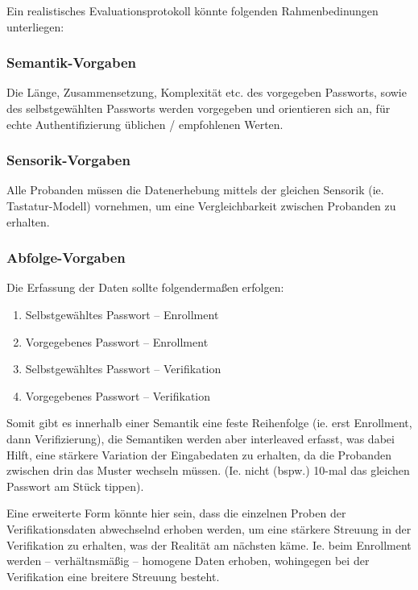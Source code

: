 \documentclass{article}
\begin{document}
Ein realistisches Evaluationsprotokoll könnte folgenden Rahmenbedinungen unterliegen:

\subsubsection*{Semantik-Vorgaben}

Die Länge, Zusammensetzung, Komplexität etc. des vorgegeben Passworts, sowie des selbstgewählten Passworts
werden vorgegeben und orientieren sich an, für echte Authentifizierung üblichen / empfohlenen Werten.

\subsubsection*{Sensorik-Vorgaben}

Alle Probanden müssen die Datenerhebung mittels der gleichen Sensorik (ie. Tastatur-Modell) vornehmen, um
eine Vergleichbarkeit zwischen Probanden zu erhalten.

\subsubsection*{Abfolge-Vorgaben}

Die Erfassung der Daten sollte folgendermaßen erfolgen:

\begin{enumerate}
	\item Selbstgewähltes Passwort – Enrollment
	\item Vorgegebenes Passwort – Enrollment
	\item Selbstgewähltes Passwort – Verifikation
	\item Vorgegebenes Passwort – Verifikation
\end{enumerate}

Somit gibt es innerhalb einer Semantik eine feste Reihenfolge (ie. erst Enrollment, dann Verifizierung),
die Semantiken werden aber interleaved erfasst, was dabei Hilft, eine stärkere Variation der Eingabedaten
zu erhalten, da die Probanden zwischen drin das Muster wechseln müssen. (Ie. nicht (bspw.) 10-mal das 
gleichen Passwort am Stück tippen).

Eine erweiterte Form könnte hier sein, dass die einzelnen Proben der Verifikationsdaten abwechselnd 
erhoben werden, um eine stärkere Streuung in der Verifikation zu erhalten, was der Realität am nächsten 
käme. Ie. beim Enrollment werden – verhältnsmäßig – homogene Daten erhoben, wohingegen bei der Verifikation
eine breitere Streuung besteht.
\end{document}
